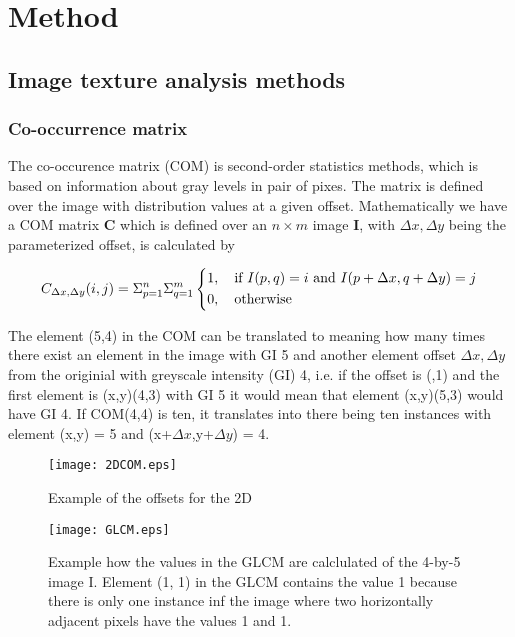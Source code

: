 \chapter{Method}


\section{Image texture analysis methods}
\subsection{Co-occurrence matrix}


The co-occurence matrix (COM) is second-order statistics methods, which is based on information about gray levels in pair of pixes. The matrix is defined over the image with distribution values at a given offset. Mathematically we have a COM matrix \textbf{C} which is defined over an $n \times m$ image \textbf{I}, with $\Delta x, \Delta y$ being the parameterized offset, is calculated by

\[
C_{\Delta x, \Delta y}(i, j) = \Sigma_{p=1}^n\Sigma_{q=1}^m
\begin{dcases}
  1, \quad \text{if } I(p,q)=i \text{ and } I(p+\Delta x, q+ \Delta y) =j \\
  0, \quad \text{otherwise}
\end{dcases}
\]

The element (5,4) in the COM can be translated to meaning how many times there exist an element in the image with GI  5 and another element offset $\Delta x, \Delta y$ from the originial with greyscale intensity  (GI) 4, i.e. if the offset is (,1) and the first element is (x,y)(4,3) with GI 5 it would mean that element (x,y)(5,3) would have GI 4. If COM(4,4) is ten, it translates into there being ten instances with element (x,y) = 5 and (x+$\Delta x$,y+$\Delta y$) = 4.

\begin{figure}[H]
  \centering
  \texttt{[image: 2DCOM.eps]}
  \caption{Example of the offsets for the 2D}\label{2DCOM}
\end{figure}

\begin{figure}[H]
  \centering
  \texttt{[image: GLCM.eps]}
  \caption{Example how the values in the GLCM are calclulated of the 4-by-5 image I. Element (1, 1) in the GLCM contains the value 1 because there is only one instance inf the image where two horizontally adjacent pixels have the values 1 and 1.}\label{GLCM}
\end{figure}


